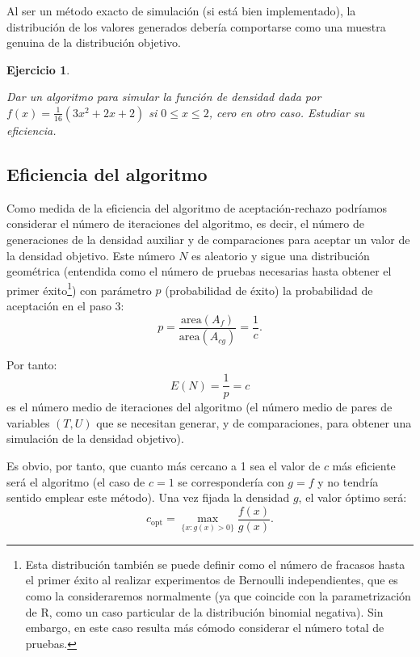 \documentclass[
  spanish,
  10pt,
]{book}
\theoremstyle{break}
\newtheorem{exercise}{Ejercicio}[chapter]
\theoremstyle{nonumberplain}
\let\oldfootnote\footnote
\renewcommand\footnote[1]{\oldfootnote{\hspace{2mm}#1}}
\begin{document}
Al ser un método exacto de simulación (si está bien implementado), la distribución de los valores generados debería comportarse como una muestra genuina de la distribución objetivo.

\begin{exercise}
\protect\hypertarget{exr:dacotada-ar}{}\label{exr:dacotada-ar}

Dar un algoritmo para simular la función de densidad dada por
\(f\left(x\right) = \frac{1}{16} \left( 3x^{2}+2x+2 \right)\) si
\(0 \le x \le 2\), cero en otro caso. Estudiar su eficiencia.
\end{exercise}

\subsection{Eficiencia del algoritmo}\label{eficiencia-del-algoritmo}

Como medida de la eficiencia del algoritmo de aceptación-rechazo podríamos considerar el número de iteraciones del algoritmo, es decir, el número de generaciones de la densidad auxiliar y de comparaciones para aceptar un valor de la densidad objetivo.
Este número \(N\) es aleatorio y sigue una distribución geométrica (entendida como el número de pruebas necesarias hasta obtener el primer éxito\footnote{Esta distribución también se puede definir como el número de fracasos hasta el primer éxito al realizar experimentos de Bernoulli independientes, que es como la consideraremos normalmente (ya que coincide con la parametrización de R, como un caso particular de la distribución binomial negativa).
  Sin embargo, en este caso resulta más cómodo considerar el número total de pruebas.}) con parámetro \(p\) (probabilidad de éxito) la probabilidad de aceptación en el paso 3:
\[p = \frac{\text{area}\left(A_{f}\right)}{\text{area}\left( A_{cg}\right)} = \frac{1}{c}.\]

Por tanto:
\[E\left( N \right) = \frac1p = c\]
es el número medio de iteraciones del algoritmo (el número medio de pares de variables \(\left( T,U\right)\) que se necesitan generar, y de comparaciones, para obtener una simulación de la densidad objetivo).

Es obvio, por tanto, que cuanto más cercano a 1 sea el valor de \(c\) más eficiente será el algoritmo (el caso de \(c=1\) se correspondería con \(g=f\) y no tendría sentido emplear este método).
Una vez fijada la densidad \(g\), el valor óptimo será:
\[c_{\text{opt}}=\max_{\{x : g(x) > 0\}} \frac{f(x)}{g(x)}.\]
\end{document}
